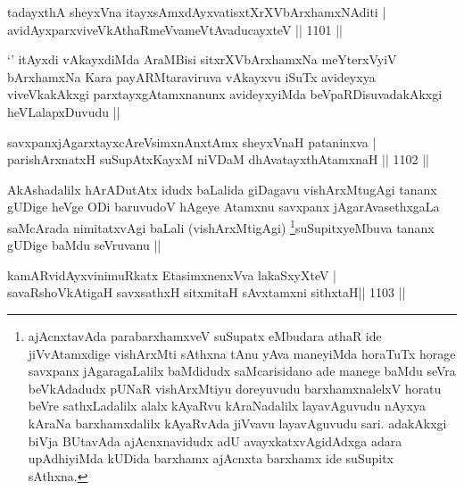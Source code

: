 
\begin{shl}
tadayxthA sheyxVna itayxsAmxdAyxvatisxtXrXVbArxhamxNAditi | \\
avidAyxparxviveVkAthaRmeVvameVtAvaducayxteV \hfill||  1101 ||  
\end{shl}

\begin{artha}
`\stext' itAyxdi vAkayxdiMda AraMBisi sitxrXVbArxhamxNa meYterxVyiV bArxhamxNa Kara payARMtaraviruva vAkayxvu iSuTx avideyxya viveVkakAkxgi parxtayxgAtamxnanunx avideyxyiMda beVpaRDisuvadakAkxgi heVLalapxDuvudu ||
\end{artha}


\begin{shl}
savxpanxjAgarxtayxcAreV\s simxnAnxtAmx sheyxVnaH pataninxva | \\
parishArxnatxH suSupAtxKayxM niVDaM dhAvatayxthA\s \s tamxnaH \hfill||  1102 ||  
\end{shl}

\begin{artha}
AkAshadalilx hArADutAtx idudx baLalida giDagavu vishArxMtugAgi tananx gUDige heVge ODi baruvudoV hAgeye Atamxnu savxpanx jAgarAvasethxgaLa saMcArada nimitatxvAgi baLali (vishArxMtigAgi) \footnote{ajAcnxtavAda parabarxhamxveV suSupatx eMbudara athaR ide jiVvAtamxdige vishArxMti sAthxna tAnu yAva maneyiMda horaTuTx horage savxpanx jAgaragaLalilx baMdidudx saMcarisidano ade manege baMdu seVra beVkAdadudx pUNaR vishArxMtiyu doreyuvudu barxhamxnalelxV horatu beVre sathxLadalilx alalx kAyaRvu kAraNadalilx layavAguvudu nAyxya kAraNa barxhamxdalilx kAyaRvAda jiVvavu layavAguvudu sari. adakAkxgi biVja BUtavAda ajAcnxnavidudx adU avayxkatxvAgidAdxga adara upAdhiyiMda kUDida barxhamx ajAcnxta barxhamx ide suSupitx sAthxna.}suSupitxyeMbuva tananx gUDige baMdu seVruvanu ||
\end{artha}


\begin{shl}
kamARvidAyxvinimuRkatx EtasimxnenxVva lakaSxyXteV | \\
savaRshoVkAtigaH savxsathxH sitxmitaH sAvxtamxni sithxtaH\hfill ||  1103 ||  
\end{shl}


